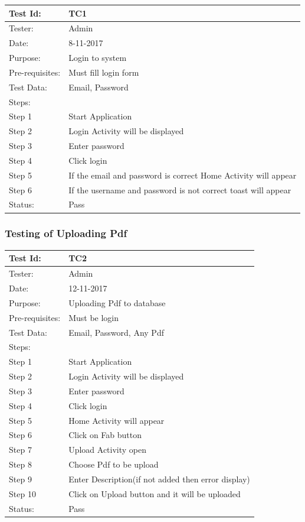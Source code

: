 \begin{center}
\begin{tabular}{ | m{5em} | m{5cm}|} 
\hline
Test Id: & TC1   \\ 
\hline
Tester: & Admin  \\ 
\hline
Date: & 8-11-2017  \\ 
\hline
Purpose: & Login to system   \\ 
\hline
Pre-requisites: & Must fill login form   \\ 
\hline
Test Data: & Email, Password   \\ 
\hline
Steps: &  \\
\hline  
Step 1 &  Start Application \\ 
Step 2 &  Login Activity will be displayed  \\ 
Step 3 &  Enter password  \\ 
Step 4 &  Click login  \\ 
Step 5 &  If the email and password is correct Home Activity will appear  \\ 
Step 6 &  If the username and password is not correct toast will appear \\
\hline
Status: & Pass   \\ 
\hline
\end{tabular}
\end{center}

\subsubsection{Testing of Uploading Pdf} 	

 \begin{center}
\begin{tabular}{ | m{5em} | m{5cm}|} 
\hline
Test Id: & TC2   \\ 
\hline
Tester: & Admin  \\ 
\hline
Date: & 12-11-2017  \\ 
\hline
Purpose: & Uploading Pdf to database   \\ 
\hline
Pre-requisites: & Must be login   \\ 
\hline
Test Data: & Email, Password, Any Pdf   \\ 
\hline
Steps: &  \\
\hline  
Step 1 &  Start Application \\ 
Step 2 &  Login Activity will be displayed  \\ 
Step 3 &  Enter password  \\ 
Step 4 &  Click login  \\ 
Step 5 &  Home Activity will appear  \\ 
Step 6 &  Click on Fab button \\
Step 7 &  Upload Activity open \\
Step 8 &  Choose Pdf to be upload \\
Step 9 &  Enter Description(if not added then error display) \\
Step 10 &  Click on Upload button and it will be uploaded \\
\hline
Status: & Pass   \\ 
\hline
\end{tabular}
\end{center}


